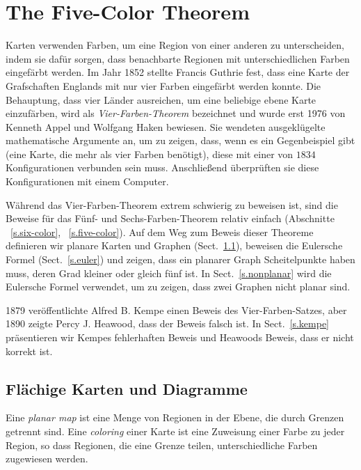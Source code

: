 
\chapter{The Five-Color Theorem}\label{c.five}


Karten verwenden Farben, um eine Region von einer anderen zu unterscheiden, indem sie dafür sorgen, dass benachbarte Regionen mit unterschiedlichen Farben eingefärbt werden. Im Jahr 1852 stellte Francis Guthrie fest, dass eine Karte der Grafschaften Englands mit nur vier Farben eingefärbt werden konnte.
Die Behauptung, dass vier Länder ausreichen, um eine beliebige ebene Karte einzufärben, wird als \emph{Vier-Farben-Theorem} bezeichnet und wurde erst 1976 von Kenneth Appel und Wolfgang Haken bewiesen. Sie wendeten ausgeklügelte mathematische Argumente an, um zu zeigen, dass, wenn es ein Gegenbeispiel gibt (eine Karte, die mehr als vier Farben benötigt), diese mit einer von $1834$ Konfigurationen verbunden sein muss. Anschließend überprüften sie diese Konfigurationen mit einem Computer.

Während das Vier-Farben-Theorem extrem schwierig zu beweisen ist, sind die Beweise für das Fünf- und Sechs-Farben-Theorem relativ einfach (Abschnitte ~\ref{s.six-color}, ~\ref{s.five-color}). Auf dem Weg zum Beweis dieser Theoreme definieren wir planare Karten und Graphen (Sect.~\ref{s.planar}), beweisen die Eulersche Formel (Sect.~\ref{s.euler}) und zeigen, dass ein planarer Graph Scheitelpunkte haben muss, deren Grad kleiner oder gleich fünf ist. In Sect.~\ref{s.nonplanar} wird die Eulersche Formel verwendet, um zu zeigen, dass zwei Graphen nicht planar sind.

1879 veröffentlichte Alfred B. Kempe einen Beweis des Vier-Farben-Satzes, aber 1890 zeigte Percy J. Heawood, dass der Beweis falsch ist. In Sect.~\ref{s.kempe} präsentieren wir Kempes fehlerhaften Beweis und Heawoods Beweis, dass er nicht korrekt ist.

\section{Flächige Karten und Diagramme}\label{s.planar}

\begin{definition}
Eine \textit{planar map} ist eine Menge von Regionen in der Ebene, die durch Grenzen getrennt sind. Eine \textit{coloring} einer Karte ist eine Zuweisung einer Farbe zu jeder Region, so dass Regionen, die eine Grenze teilen, unterschiedliche Farben zugewiesen werden.
\end{definition}

